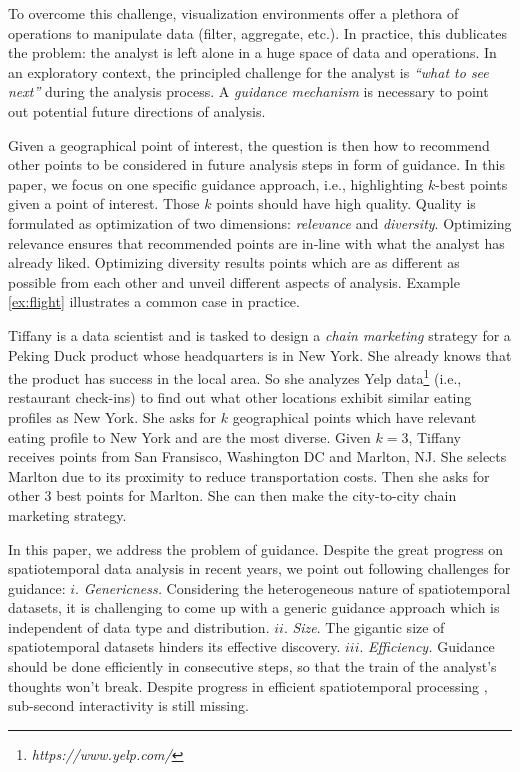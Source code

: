 To overcome this challenge, visualization environments offer a plethora of operations to manipulate data (filter, aggregate, etc.). In practice, this dublicates the problem: the analyst is left alone in a huge space of data and operations. 
In an exploratory context,
the principled challenge for the analyst is {\em ``what to see next''} during the analysis process. A {\em guidance mechanism} is necessary to point out potential future directions of analysis.

Given a geographical point of interest, the question is then how to recommend other points to be considered in future analysis steps in form of guidance. In this paper, we focus on one specific guidance approach, i.e., highlighting $k$-best points given a point of interest. Those $k$ points should have high quality. Quality is formulated as optimization of two dimensions: {\em relevance} and {\em diversity}. Optimizing relevance ensures that recommended points are in-line with what the analyst has already liked. Optimizing diversity results points which are as different as possible from each other and unveil different aspects of analysis. Example \ref{ex:flight} illustrates a common case in practice.

\begin{example}
\label{ex:flight}
Tiffany is a data scientist and is tasked to design a {\em chain marketing} strategy for a Peking Duck product whose headquarters is in New York. She already knows that the product has success in the local area. So she analyzes Yelp data\footnote{\it https://www.yelp.com/} (i.e., restaurant check-ins) to find out what other locations exhibit similar eating profiles as New York. She asks for $k$ geographical points which have relevant eating profile to New York and are the most diverse. Given $k=3$, Tiffany receives points from San Fransisco, Washington DC and Marlton, NJ. She selects Marlton due to its proximity to reduce transportation costs. Then she asks for other 3 best points for Marlton. She can then make the city-to-city chain marketing strategy.
\end{example}

In this paper, we address the problem of guidance. Despite the great progress on spatiotemporal data analysis in recent years, we point out following challenges for guidance:
$i.$ {\em Genericness.} Considering the heterogeneous nature of spatiotemporal datasets, it is challenging to come up with a generic guidance approach which is independent of data type and distribution.
$ii.$ {\em Size}. The gigantic size of spatiotemporal datasets hinders its effective discovery. 
$iii.$ {\em Efficiency.} Guidance should be done efficiently in consecutive steps, so that the train of the analyst's thoughts won't break. Despite progress in efficient spatiotemporal processing \cite{yu2015geospark}, sub-second interactivity is still missing.

